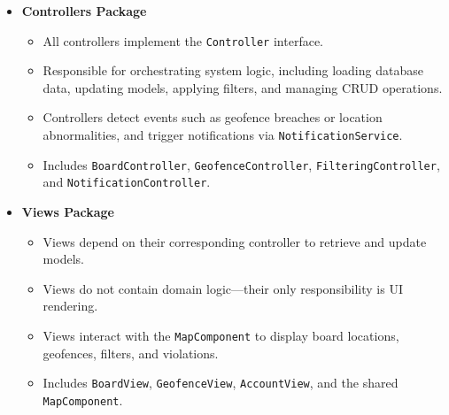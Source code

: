 \begin{itemize}
    \item \textbf{Controllers Package}
    \begin{itemize}
        \item All controllers implement the \texttt{Controller} interface.
        \item Responsible for orchestrating system logic, including loading database data, updating models, applying filters, and managing CRUD operations.
        \item Controllers detect events such as geofence breaches or location abnormalities, and trigger notifications via \texttt{NotificationService}.
        \item Includes \texttt{BoardController}, \texttt{GeofenceController}, \texttt{FilteringController}, and \texttt{NotificationController}.
    \end{itemize}

    \item \textbf{Views Package}
    \begin{itemize}
        \item Views depend on their corresponding controller to retrieve and update models.
        \item Views do not contain domain logic---their only responsibility is UI rendering.
        \item Views interact with the \texttt{MapComponent} to display board locations, geofences, filters, and violations.
        \item Includes \texttt{BoardView}, \texttt{GeofenceView}, \texttt{AccountView}, and the shared \texttt{MapComponent}.
    \end{itemize}


\end{itemize}
